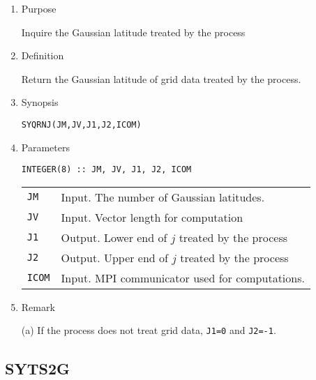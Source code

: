 \documentclass[a4paper]{scrartcl}
\begin{document}
\begin{enumerate}

\item Purpose 

Inquire the Gaussian latitude treated by the process  

\item Definition

Return the Gaussian latitude of grid data treated by the process.  

\item Synopsis 
    
\texttt{SYQRNJ(JM,JV,J1,J2,ICOM)}
  
\item Parameters

\begin{verbatim}
INTEGER(8) :: JM, JV, J1, J2, ICOM
\end{verbatim}    

\begin{tabular}{ll}
\texttt{JM} & Input. The number of Gaussian latitudes.\\
\texttt{JV} & Input. Vector length for computation\\
\texttt{J1} & Output. Lower end of $j$ treated by the process\\
\texttt{J2} & Output. Upper end of $j$ treated by the process\\
\texttt{ICOM} & Input. MPI communicator used for computations.
\end{tabular}

\item Remark

(a) If the process does not treat grid data, 
\texttt{J1=0} and \texttt{J2=-1}.

\end{enumerate}


\subsection{SYTS2G}
\end{document}
